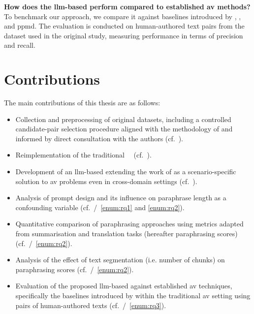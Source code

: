 \begin{questions}
    \item \textbf{How does the \ac{llm}-based \impAppr{} perform compared to established \ac{av} methods?} \label{enum:rq3} \hfill \\
    To benchmark our approach, we compare it against baselines introduced by \citet{koppel_determining_2014}, \unmasking{}, and \acs{ppmd}.
    The evaluation is conducted on human-authored text pairs from the \dataStudent{} dataset used in the original study, measuring performance in terms of precision and recall.
    
\end{questions}



\section{Contributions}
\label{sec:contributions}
The main contributions of this thesis are as follows:
\begin{itemize}
    \item Collection and preprocessing of original datasets, including a controlled candidate-pair selection procedure aligned with the methodology of \citet{koppel_determining_2014} and informed by direct consultation with the authors (cf.~).
    \item Reimplementation of the traditional \impAppr{}~\citep{koppel_determining_2014}\ (cf.~).
    \item Development of an \ac{llm}-based \impAppr{} extending the work of \citet{koppel_determining_2014} as a scenario-specific solution to \ac{av} problems even in cross-domain settings (cf.~). 
    \item Analysis of prompt design and its influence on paraphrase length as a confounding variable (cf.~/~\ref{enum:rq1} and \ref{enum:rq2}).
    \item Quantitative comparison of paraphrasing approaches using metrics adapted from summarisation and translation tasks (hereafter paraphrasing scores) (cf.~/~\ref{enum:rq2}).
    \item Analysis of the effect of text segmentation (i.e. number of chunks) on paraphrasing scores (cf.~/~\ref{enum:rq2}).
    \item Evaluation of the proposed \ac{llm}-based \impAppr{} against established \ac{av} techniques, specifically the baselines introduced by \citet{koppel_determining_2014}
    within the traditional \ac{av} setting using pairs of human-authored texts (cf.~/~\ref{enum:rq3}).
   
\end{itemize}



